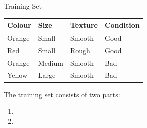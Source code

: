 \documentclass[usenames,dvipsnames]{beamer}
\begin{document}
\begin{frame}{Training Set}

\begin{table}[]
	\begin{tabular}{|l|l|l||l|}
		\hline 
				\rowcolor{white}
		\textbf{Colour} & \textbf{Size} & \textbf{Texture} & \textbf{Condition} \\ \hline 
		Orange & Small & Smooth  & Good      \\
		Red    & Small  & Rough  & Good \\
		Orange & Medium & Smooth & Bad \\
		Yellow & Large  & Smooth & Bad \\ \hline 
		
	\end{tabular}
\end{table}

\pause The training set consists of two parts:
\begin{enumerate}
	\item \pause \color{Lavender}{Features (Input Variables)}
	\item \pause \color{Tan}{Output or Response Variable}
\end{enumerate}
\end{frame}
\end{document}
